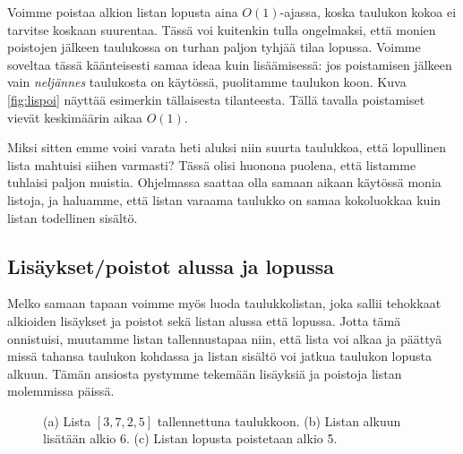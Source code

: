Voimme poistaa alkion listan lopusta aina $O(1)$-ajassa,
koska taulukon kokoa ei tarvitse koskaan suurentaa.
Tässä voi kuitenkin tulla ongelmaksi, että monien poistojen
jälkeen taulukossa on turhan paljon tyhjää tilaa lopussa.
Voimme soveltaa tässä käänteisesti samaa ideaa kuin lisäämisessä:
jos poistamisen jälkeen vain \emph{neljännes} taulukosta on käytössä,
puolitamme taulukon koon.
Kuva \ref{fig:lispoi} näyttää esimerkin tällaisesta tilanteesta.
Tällä tavalla poistamiset vievät keskimäärin aikaa $O(1)$.

Miksi sitten emme voisi varata heti aluksi niin suurta taulukkoa,
että lopullinen lista mahtuisi siihen varmasti?
Tässä olisi huonona puolena, että listamme tuhlaisi paljon muistia.
Ohjelmassa saattaa olla samaan aikaan käytössä monia listoja,
ja haluamme, että listan varaama taulukko on samaa kokoluokkaa
kuin listan todellinen sisältö.

\subsection{Lisäykset/poistot alussa ja lopussa}

Melko samaan tapaan voimme myös luoda taulukkolistan,
joka sallii tehokkaat alkioiden lisäykset ja poistot
sekä listan alussa että lopussa.
Jotta tämä onnistuisi, muutamme listan tallennustapaa niin,
että lista voi alkaa ja päättyä missä tahansa taulukon
kohdassa ja listan sisältö voi jatkua taulukon lopusta alkuun.
Tämän ansiosta pystymme tekemään lisäyksiä ja poistoja
listan molemmissa päissä.

\begin{figure}
\center
{}
\caption{(a) Lista $[3,7,2,5]$ tallennettuna taulukkoon.
(b) Listan alkuun lisätään alkio 6.
(c) Listan lopusta poistetaan alkio 5.}
\label{fig:lismol}
\end{figure}

